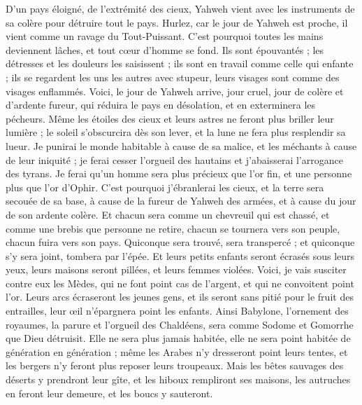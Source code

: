 \begin{multicols}{2}
D'un pays éloigné, de l'extrémité des cieux, Yahweh vient avec les instruments de sa colère pour détruire tout le pays.
Hurlez, car le jour de Yahweh est proche, il vient comme un ravage du Tout-Puissant.
C'est pourquoi toutes les mains deviennent lâches, et tout cœur d'homme se fond.
Ils sont épouvantés ; les détresses et les douleurs les saisissent ; ils sont en travail comme celle qui enfante ; ils se regardent les uns les autres avec stupeur, leurs visages sont comme des visages enflammés.
Voici, le jour de Yahweh arrive, jour cruel, jour de colère et d'ardente fureur, qui réduira le pays en désolation, et en exterminera les pécheurs.
Même les étoiles des cieux et leurs astres ne feront plus briller leur lumière ; le soleil s'obscurcira dès son lever, et la lune ne fera plus resplendir sa lueur.
Je punirai le monde habitable à cause de sa malice, et les méchants à cause de leur iniquité ; je ferai cesser l'orgueil des hautains et j'abaisserai l'arrogance des tyrans.
Je ferai qu'un homme sera plus précieux que l'or fin, et une personne plus que l'or d'Ophir.
C'est pourquoi j'ébranlerai les cieux, et la terre sera secouée de sa base, à cause de la fureur de Yahweh des armées, et à cause du jour de son ardente colère.
Et chacun sera comme un chevreuil qui est chassé, et comme une brebis que personne ne retire, chacun se tournera vers son peuple, chacun fuira vers son pays.
Quiconque sera trouvé, sera transpercé ; et quiconque s'y sera joint, tombera par l'épée.
Et leurs petits enfants seront écrasés sous leurs yeux, leurs maisons seront pillées, et leurs femmes violées.
Voici, je vais susciter contre eux les Mèdes, qui ne font point cas de l'argent, et qui ne convoitent point l'or.
Leurs arcs écraseront les jeunes gens, et ils seront sans pitié pour le fruit des entrailles, leur œil n'épargnera point les enfants.
Ainsi Babylone, l'ornement des royaumes, la parure et l'orgueil des Chaldéens, sera comme Sodome et Gomorrhe que Dieu détruisit.
Elle ne sera plus jamais habitée, elle ne sera point habitée de génération en génération ; même les Arabes n'y dresseront point leurs tentes, et les bergers n'y feront plus reposer leurs troupeaux.
Mais les bêtes sauvages des déserts y prendront leur gîte, et les hiboux rempliront ses maisons, les autruches en feront leur demeure, et les boucs y sauteront.

\end{multicols}
